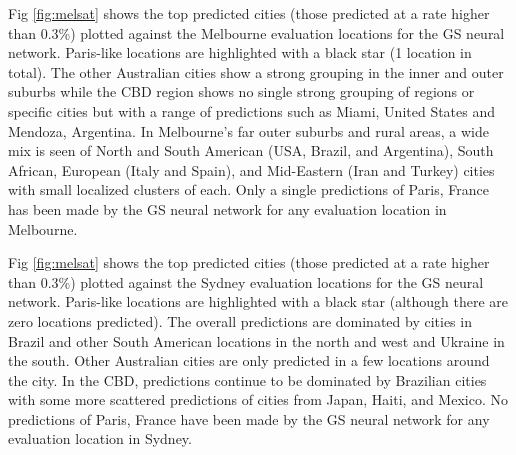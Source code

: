 \documentclass[10pt,letterpaper,hidelinks]{article}
\begin{document}
%

Fig \ref{fig:melsat} shows the top predicted cities (those predicted at a rate higher than 0.3\%) plotted against the Melbourne evaluation locations for the GS neural network. Paris-like locations are highlighted with a black star (1 location in total). The other Australian cities show a strong grouping in the inner and outer suburbs while the CBD region shows no single strong grouping of regions or specific cities but with a range of predictions such as Miami, United States and Mendoza, Argentina. In Melbourne's far outer suburbs and rural areas, a wide mix is seen of North and South American (USA, Brazil, and Argentina), South African, European (Italy and Spain), and Mid-Eastern (Iran and Turkey) cities with small localized clusters of each. Only a single predictions of Paris, France has been made by the GS neural network for any evaluation location in Melbourne.


Fig \ref{fig:melsat} shows the top predicted cities (those predicted at a rate higher than 0.3\%) plotted against the Sydney evaluation locations for the GS neural network. Paris-like locations are highlighted with a black star (although there are zero locations predicted). The overall predictions are dominated by cities in Brazil and other South American locations in the north and west and Ukraine in the south. Other Australian cities are only predicted in a few locations around the city. In the CBD, predictions continue to be dominated by Brazilian cities with some more scattered predictions of cities from Japan, Haiti, and Mexico. No predictions of Paris, France have been made by the GS neural network for any evaluation location in Sydney.
\end{document}
